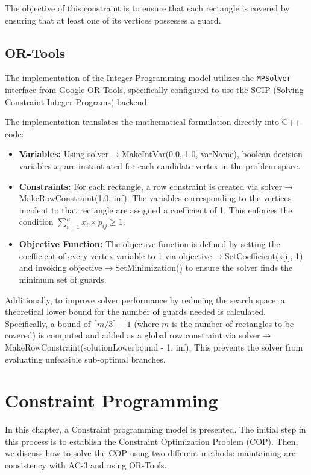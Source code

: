 \documentclass{report}
\begin{document}
The objective of this constraint is to ensure that each rectangle is covered by ensuring that at least one of its vertices possesses a guard.

\section{OR-Tools}
The implementation of the Integer Programming model utilizes the \texttt{MPSolver} interface from Google OR-Tools, specifically configured to use the SCIP (Solving Constraint Integer Programs) backend.

The implementation translates the mathematical formulation directly into C++ code:
\begin{itemize}
    \item \textbf{Variables:} Using solver$\to$MakeIntVar(0.0, 1.0, varName), boolean decision variables $x_i$ are instantiated for each candidate vertex in the problem space.
    \item \textbf{Constraints:} For each rectangle, a row constraint is created via solver$\to$ MakeRowConstraint(1.0, inf). The variables corresponding to the vertices incident to that rectangle are assigned a coefficient of 1. This enforces the condition $\sum_{i=1}^{n} x_i \times p_{ij} \ge 1$.
    \item \textbf{Objective Function:} The objective function is defined by setting the coefficient of every vertex variable to 1 via objective$\to$SetCoefficient(x[i], 1) and invoking objective$\to$SetMinimization() to ensure the solver finds the minimum set of guards.
\end{itemize}

Additionally, to improve solver performance by reducing the search space, a theoretical lower bound for the number of guards needed is calculated. Specifically, a bound of $\lceil m / 3 \rceil - 1$ (where $m$ is the number of rectangles to be covered) is computed and added as a global row constraint via solver$\to$MakeRowConstraint\allowbreak (solutionLowerbound - 1, inf). This prevents the solver from evaluating unfeasible sub-optimal branches.

\chapter{Constraint Programming}
In this chapter, a Constraint programming model is presented. The initial step in this process is to establish the Constraint Optimization Problem (COP). Then, we discuss how to solve the COP using two different methods: maintaining arc-consistency with AC-3 and using OR-Tools.
\end{document}
